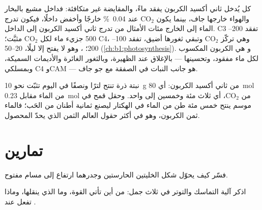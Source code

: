 \begin{proposition}\label{prop:b1:plant-transport:wue}
كل  يُدخل ثاني أكسيد الكربون يفقد ماءً، والمقايضة غير متكافئة:
فداخل  مشبع بالبخار والهواء خارجها جاف، بينما يكون
$\mathrm{CO_2}$ عند \qty{0.04}{\%} خارجًا وأخفض داخلًا، فيكون تدرج
الماء إلى الخارج مئات الأمثال من تدرج ثاني أكسيد الكربون إلى
الداخل.  C3 تفقد \qtyrange{200}{500}{} جزيء ماء لكل
$\mathrm{CO_2}$ مثبَّت؛  C4، وهي تركّز $\mathrm{CO_2}$ وتبقي
ثغورها أضيق، تفقد \qtyrange{100}{200}{}؛ ، وهو لا يفتح
إلا ليلًا، \qtyrange{20}{50}{} (\cref{ch:b1:photosynthesis}).
و\emph{} هي الكربون المكسوب لكل ماء مفقود،
وتحسينها --- بالإغلاق عند الظهيرة، وبالثغور الغائرة والأديمات
السميكة، وبمسلكي C4 وCAM --- هو جانب النبات في الصفقة مع جو جاف.
\end{proposition}

\begin{example}\label{ex:b1:plant-transport:bargain}
نبتة ذرة تنتح لترًا ونصفًا في اليوم تثبّت نحو \qty{10}{g} من ثاني
أكسيد الكربون: أي \qty{80}{mol} من الماء مقابل \qty{0.23}{mol} من
$\mathrm{CO_2}$، أي ثلاث مئة وخمسين إلى واحد. وحقل قمح في موسم
ينتح خمس مئة طن من الماء في الهكتار ليصنع ثمانية أطنان من الحَب؛
فالماء ثمن الكربون، وهو في أكثر حقول العالم الثمن الذي يحدّ
المحصول.
\end{example}

\section{تمارين}

\begin{exercise}[$\star$]\label{exo:b1:plant-transport:1}
فسّر كيف يحوّل شكل الخليتين الحارستين وجدرهما ارتفاع  إلى
مسام مفتوح.
\end{exercise}

\begin{exercise}[$\star$]\label{exo:b1:plant-transport:2}
اذكر آلية التماسك والتوتر في ثلاث جمل: من أين تأتي القوة، وما الذي
ينقلها، وماذا تفعل عند .
\end{exercise}

